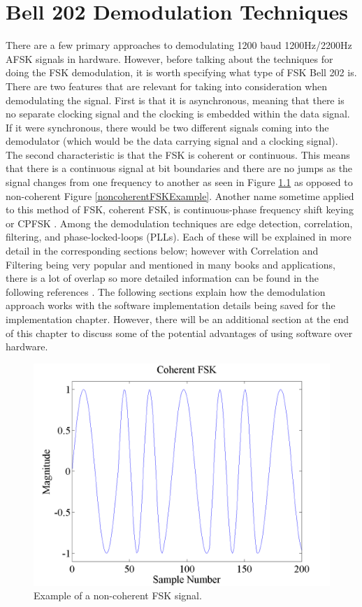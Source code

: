 \chapter{Bell 202 Demodulation Techniques}
There are a few primary approaches to demodulating 1200 baud 1200Hz/2200Hz AFSK signals in hardware.  However, before talking about the techniques for doing the FSK demodulation, it is worth specifying what type of FSK Bell 202 is. There are two features that are relevant for taking into consideration when demodulating the signal. First is that it is asynchronous, meaning that there is no separate clocking signal and the clocking is embedded within the data signal. If it were synchronous, there would be two different signals coming into the demodulator (which would be the data carrying signal and a clocking signal). The second characteristic is that the FSK is coherent or continuous. This means that there is a continuous signal at bit boundaries and there are no jumps as the signal changes from one frequency to another as seen in Figure \ref{coherentFSKExample} as opposed to non-coherent Figure \ref{noncoherentFSKExample}. Another name sometime applied to this method of FSK, coherent FSK, is continuous-phase frequency shift keying or CPFSK \cite{WikipediaCPFSK}. Among the demodulation techniques are edge detection, correlation, filtering, and phase-locked-loops (PLLs). Each of these will be explained in more detail in the corresponding sections below; however with Correlation and Filtering being very popular and mentioned in many books and applications, there is a lot of overlap so more detailed information can be found in the following references \cite{MarvinK.Simon1995,Sklar1988,J.Das1986,Proakis1983,Seguine2006,Semiconductor}. The following sections explain how the demodulation approach works with the software implementation details being saved for the implementation chapter. However, there will be an additional section at the end of this chapter to discuss some of the potential advantages of using software over hardware.
\begin{figure}
  \centering
	\includegraphics[width=0.75\linewidth]{images/CoherentFSK.png} 
	\caption{Example of a non-coherent FSK signal.}
   \label{coherentFSKExample}
\end{figure}
